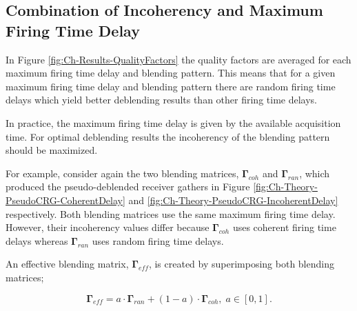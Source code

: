 			
			
				
\subsection*{Combination of Incoherency and Maximum Firing Time Delay}

In Figure \ref{fig:Ch-Results-QualityFactors} the quality factors are averaged for each maximum firing time delay and blending pattern. This means that for a given maximum firing time delay and blending pattern there are random firing time delays which yield better deblending results than other firing time delays.

In practice, the maximum firing time delay is given by the available acquisition time. For optimal deblending results the incoherency of the blending pattern should be maximized.

For example, consider again the two blending matrices, $\mathbf{\Gamma}_{coh}$ and $\mathbf{\Gamma}_{ran}$, which produced the pseudo-deblended receiver gathers in Figure \ref{fig:Ch-Theory-PseudoCRG-CoherentDelay} and \ref{fig:Ch-Theory-PseudoCRG-IncoherentDelay} respectively. Both blending matrices use the same maximum firing time delay. However, their incoherency values differ because $\mathbf{\Gamma}_{coh}$ uses coherent firing time delays whereas $\mathbf{\Gamma}_{ran}$ uses random firing time delays. 

An effective blending matrix, $\mathbf{\Gamma}_{eff}$, is created by superimposing both blending matrices;

\begin{equation}
	\mathbf{\Gamma}_{eff} = a \cdot \mathbf{\Gamma}_{ran} + (1 - a) \cdot \mathbf{\Gamma}_{coh}, \; a \in [0,1].
	\label{eq:Ch-Incoherency-EffectiveG}
\end{equation}


